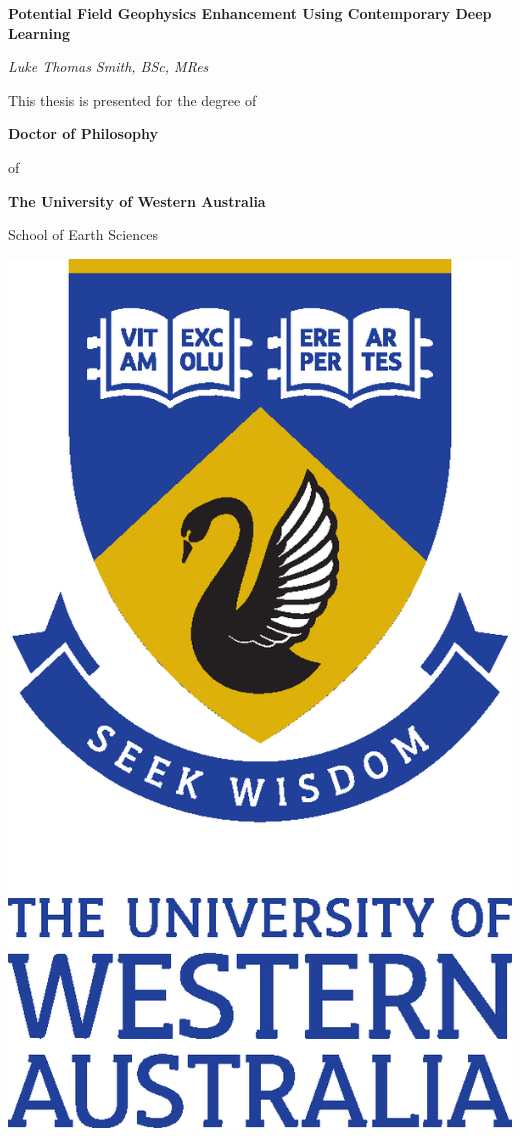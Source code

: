 \documentclass[12pt,a4paper,notitlepage]{report} %
\begin{document}
\begin{titlepage}
    \centering
    
    \vspace*{48 pt}
    {\large\textbf{Potential Field Geophysics Enhancement Using Contemporary Deep Learning}}
    
    \vspace{48 pt}
    {\itshape{{\Large Luke Thomas Smith}, BSc, MRes}}
    
    \vspace{48 pt}
    This thesis is presented for the degree of
    
    \vspace{14 pt}
    \textbf{Doctor of Philosophy}
    
    of
    
    \textbf{The University of Western Australia}
    
    \vspace{14 pt}
    School of Earth Sciences
    
    \vspace{72 pt}
    \includegraphics[scale=0.35]{fig/etc/UWA_FORMAL_PORTRAIT_CMYK}
    

\end{titlepage}
\end{document}
